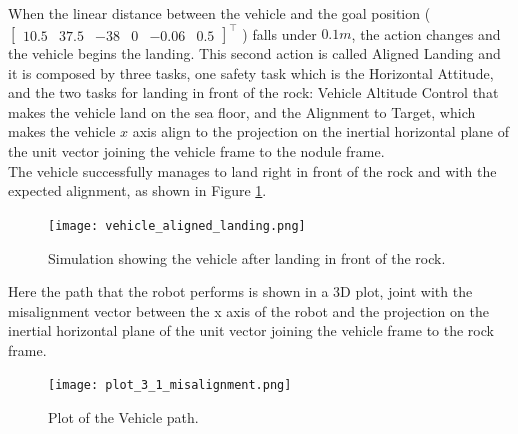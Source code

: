 \documentclass{article}
\begin{document}
When the linear distance between the vehicle and the goal position ({\small \(\begin{bmatrix} 10.5 & 37.5 & -38 & 0 & -0.06 & 0.5 \end{bmatrix}^\top\) }) falls under $0.1 m$, the action changes and the vehicle begins the landing. This second action is called Aligned Landing and it is composed by three tasks, one safety task which is the Horizontal Attitude, and the two tasks for landing in front of the rock: Vehicle Altitude Control that makes the vehicle land on the sea floor, and the Alignment to Target, which makes the vehicle $x$ axis align to the projection on the inertial horizontal plane of the unit vector joining the vehicle frame to the nodule frame.\\ 
The vehicle successfully manages to land right in front of the rock and with the expected alignment, as shown in Figure \ref{im:v_align_land}.

\begin{figure}[H]
	\centering
	{\texttt{[image: vehicle\_aligned\_landing.png]}}
	\caption{Simulation showing the vehicle after landing in front of the rock.}
	\label{im:v_align_land}
\end{figure}
Here the path that the robot performs is shown in a 3D plot, joint with the misalignment vector between the x axis of the robot and the projection on the inertial horizontal plane of the unit vector joining the vehicle frame to the rock frame.

\begin{figure}[H]
	\centering
	{\texttt{[image: plot\_3\_1\_misalignment.png]}}
	\caption{Plot of the Vehicle path.}
	\label{im:v_path_align_land}
\end{figure}
\end{document}
